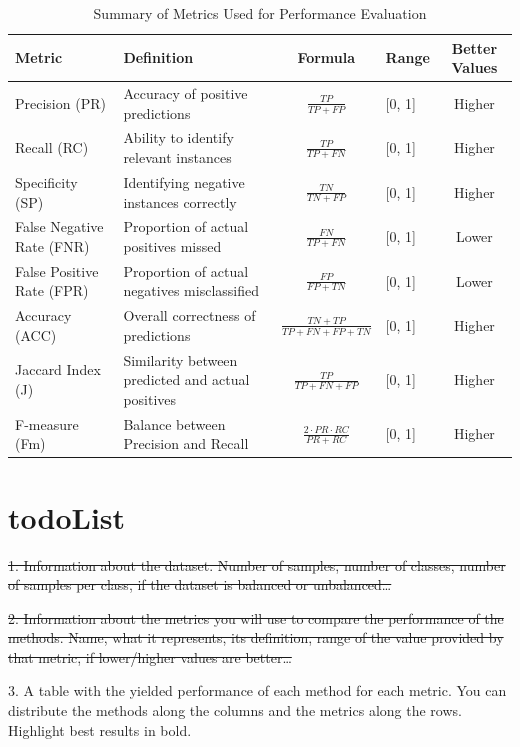 \documentclass{article}
\begin{document}
\renewcommand{\arraystretch}{1.5} %
\begin{table}[ht]
	\centering
	\caption{Summary of Metrics Used for Performance Evaluation}
	\label{tab:metrics_summary}
	\vspace{0.4cm}
	\begin{tabular}{@{}p{3cm}p{4cm}c p{2cm}c@{}}
		\toprule
		\textbf{Metric} & \textbf{Definition} & \textbf{Formula} & \textbf{Range} & \textbf{Better Values} \\ 
		\midrule
		Precision (PR) & Accuracy of positive predictions & $\frac{TP}{TP + FP}$ & [0, 1] & Higher \\ 
		Recall (RC) & Ability to identify relevant instances & $\frac{TP}{TP + FN}$ & [0, 1] & Higher \\ 
		Specificity (SP) & Identifying negative instances correctly & $\frac{TN}{TN + FP}$ & [0, 1] & Higher \\ 
		False Negative Rate (FNR) & Proportion of actual positives missed & $\frac{FN}{TP + FN}$ & [0, 1] & Lower \\ 
		False Positive Rate (FPR) & Proportion of actual negatives misclassified & $\frac{FP}{FP + TN}$ & [0, 1] & Lower \\ 
		Accuracy (ACC) & Overall correctness of predictions & $\frac{TN + TP}{TP + FN + FP + TN}$ & [0, 1] & Higher \\ 
		Jaccard Index (J) & Similarity between predicted and actual positives & $\frac{TP}{TP + FN + FP}$ & [0, 1] & Higher \\ 
		F-measure (Fm) & Balance between Precision and Recall & $\frac{2 \cdot PR \cdot RC}{PR + RC}$ & [0, 1] & Higher \\ 
		\bottomrule
	\end{tabular}
\end{table}

\section{todoList}
\sout{1. Information about the dataset. Number of samples, number of classes, 
number of samples per class, if the dataset is balanced or unbalanced…}


\sout{2. Information about the metrics you will use to compare the performance 
	of the methods. Name, what it represents, its definition, range of the 
	value provided by that metric, if lower/higher values are better…}


3. A table with the yielded performance of each method for each metric. 
You can distribute the methods along the columns and the metrics along 
the rows. Highlight best results in bold.
\end{document}
